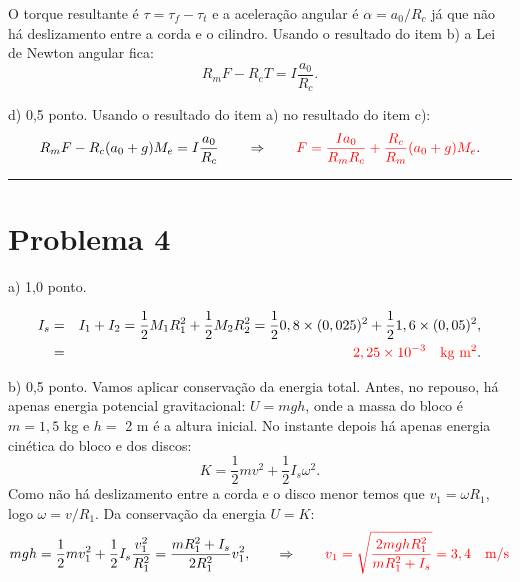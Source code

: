 \documentclass[a4paper, 11pt]{article}
\begin{document}
 O torque resultante é $\tau = \tau_f - \tau_t$ e a aceleração angular é $\alpha = a_0 /R_c$ já que não há deslizamento entre a corda e o cilindro. Usando o resultado do item b) a Lei de Newton angular fica:
{\color{red}\begin{equation}
R_m F - R_c T = I \dfrac{a_0}{R_c}. \nonumber
\end{equation}}

{\color{red}d) 0,5 ponto.} Usando o resultado do item a) no resultado do item c):
\begin{equation}
R_m F - R_c (a_0+g)M_e = I \dfrac{a_0}{R_c} \qquad \Rightarrow \qquad {\color{red}F =  \dfrac{Ia_0}{R_mR_c}+ \dfrac{R_c}{R_m} (a_0+g)M_e}. \nonumber
\end{equation}


 {\noindent\def\stackalignment{l}{\textcolor{lightcyan}{\rule{\linewidth}{2pt}}}\medskip}


\section*{Problema 4} 

{\color{red}a) 1,0 ponto.} 

\begin{eqnarray}
I_s &=& I_1+I_2 = \frac{1}{2}M_1R_1^2 + \frac{1}{2}M_2R_2^2 = \frac{1}{2}0,8 \times (0,025)^2 + \frac{1}{2}1,6 \times (0,05)^2, \nonumber \\
&=&  {\color{red}2,25 \times 10^{-3} \quad \text{kg m$^2$}}. \nonumber
\end{eqnarray}


{\color{red}b) 0,5 ponto.} Vamos aplicar conservação da energia total. Antes, no repouso, há apenas energia potencial gravitacional: $U = mgh$, onde a massa do bloco é $m=1,5$ kg e $h=$ 2 m é a altura inicial. No instante depois há apenas energia cinética do bloco e dos discos: 
\begin{equation}
K = \frac{1}{2}mv^2 + \frac{1}{2} I_s \omega^2. \nonumber
\end{equation}
Como não há deslizamento entre a corda e o disco menor temos que $v_1 = \omega R_1$, logo $\omega = v/R_1$. Da conservação da energia $U = K$:
\begin{equation}
mgh = \frac{1}{2}mv_1^2 + \frac{1}{2} I_s \dfrac{v_1^2}{R_1^2} = \dfrac{m R_1^2 + I_s}{2R_1^2} v_1^2, \qquad \Rightarrow \qquad {\color{red}v_1 = \sqrt{ \dfrac{2mghR_1^2}{m R_1^2 + I_s}  } = 3,4 \quad \text{m/s}} \nonumber 
\end{equation}
\end{document}

